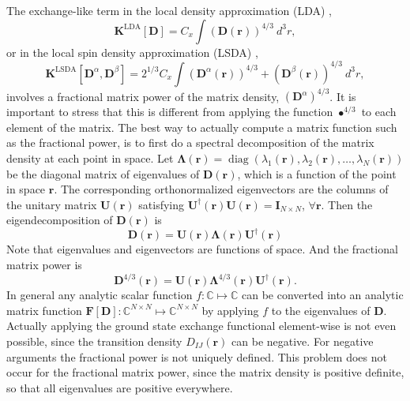 \documentclass[journal=jpclcd,manuscript=letter]{achemso}
\DeclareMathOperator{\Diag}{diag}
\newcommand\m[1]{\mathbf{#1}}
\renewcommand\vec[1]{\mathbf{#1}}
\begin{document}
The exchange-like term in the local density approximation (LDA) \cite[6.1.20]{ParrYangBook},
\begin{equation}
  \m{K}^{\text{LDA}}[\m{D}] = C_x \int (\m{D}(\vec{r}))^{4/3} ~ d^3r, \label{eqn:exchange_term_lda}
\end{equation}
or in the local spin density approximation (LSDA) \cite[8.2.16]{ParrYangBook},
\begin{equation}
  \m{K}^{\text{LSDA}}[\m{D}^{\alpha},\m{D}^{\beta}] = 2^{1/3} C_x \int (\m{D}^{\alpha}(\vec{r}))^{4/3} + (\m{D}^{\beta}(\vec{r}))^{4/3} ~ d^3r, \label{eqn:exchange_term_lsda}
  \end{equation}
involves a fractional matrix power of the matrix density, $(\m{D}^{\alpha})^{4/3}$.
It is important to stress that this is different from applying the function $\bullet^{4/3}$ to
each element of the matrix. The best way to actually compute a matrix function such as the fractional power,
is to first do a spectral decomposition of the matrix density at each point in space. Let
$\m{\Lambda}(\vec{r}) = \Diag\left(\lambda_1(\vec{r}),\lambda_2(\vec{r}),\ldots,\lambda_N(\vec{r}) \right)$ be the diagonal
matrix of eigenvalues of $\m{D}(\vec{r})$, which is a function of the point in space $\vec{r}$. The corresponding orthonormalized
eigenvectors are the columns of the unitary matrix $\m{U}(\vec{r})$ satisfying $\m{U}^{\dagger}(\vec{r}) \m{U}(\vec{r}) = \m{I}_{N \times N}$, $\forall \vec{r}$.
Then the eigendecomposition of $\m{D}(\vec{r})$ is
\begin{equation}
 \m{D}(\vec{r}) = \m{U}(\vec{r}) \m{\Lambda}(\vec{r}) \m{U}^{\dagger}(\vec{r})
\end{equation}
Note that eigenvalues and eigenvectors are functions of space. And the fractional matrix power is 
\begin{equation}
  \m{D}^{4/3}(\vec{r}) = \m{U}(\vec{r}) \m{\Lambda}^{4/3}(\vec{r}) \m{U}^{\dagger}(\vec{r}).
\end{equation}
In general any analytic scalar function $f : \mathbb{C} \mapsto \mathbb{C}$ can be converted into an analytic
matrix function $\m{F}[\m{D}]: \mathbb{C}^{N \times N} \mapsto \mathbb{C}^{N \times N}$ by applying $f$ to
the eigenvalues of $\m{D}$. 
Actually applying the ground state exchange functional element-wise is not even possible, since the transition density $D_{IJ}(\vec{r})$
can be negative. For negative arguments the fractional power is not uniquely defined. This problem does not occur for the fractional matrix
power, since the matrix density is positive definite, so that all eigenvalues are positive everywhere.
\end{document}
